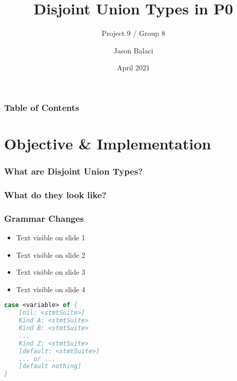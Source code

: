 \documentclass{beamer}
\title[Disjoint Union Types]{Disjoint Union Types in P0}
\subtitle{Project 9 / Group 8}
\author{Jason Balaci}
\institute{McMaster University}
\date{April 2021}
\begin{document}
\frame{\titlepage}

\begin{frame}
\frametitle{Table of Contents}
\tableofcontents
\end{frame}

\section{Objective \& Implementation}

\begin{frame}
\frametitle{What are Disjoint Union Types?}

\end{frame}

\begin{frame}
\frametitle{What do they look like?}
\end{frame}

\begin{frame}
\frametitle{Grammar Changes}

\begin{itemize}
 \item<1-> Text visible on slide 1
 \item<2-> Text visible on slide 2
 \item<3-> Text visible on slide 3
 \item<4-> Text visible on slide 4
\end{itemize}

\end{frame}


\begin{lrbox}{\anatomyOfCaseBox}
\begin{lstlisting}[language=Pascal, basicstyle=\footnotesize]
case <variable> of {
    [nil: <stmtSuite>]
    Kind A: <stmtSuite>
    Kind B: <stmtSuite>
    ...
    Kind Z: <stmtSuite>
    [default: <stmtSuite>]
    ... or ...
    [default nothing]
}
\end{lstlisting}
\end{lrbox}
\end{document}
